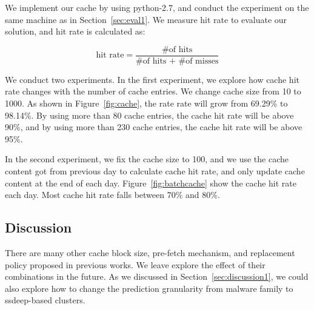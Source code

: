 We implement our cache by using python-2.7, 
and conduct the experiment on the same machine as in Section~\ref{sec:eval1}. 
We measure hit rate to evaluate our solution, and hit rate is calculated as: 

$$ \mbox{hit rate} = \dfrac{\mbox{\# of hits}}{\mbox{\# of hits + \# of misses}}$$

We conduct two experiments. In the first experiment, 
we explore how cache hit rate changes with the number of cache entries. 
We change cache size from 10 to 1000. As shown in Figure~\ref{fig:cache}, 
the rate rate will grow from 69.29\% to 98.14\%. 
By using more than 80 cache entries, the cache hit rate will be above 90\%, 
and by using more than 230 cache entries, the cache hit rate will be above 95\%. 

In the second experiment, we fix the cache size to 100, 
and we use the cache content got from previous day to calculate cache hit rate, 
and only update cache content at the end of each day. Figure~\ref{fig:batchcache} show the cache hit rate each day. 
Most cache hit rate falls between 70\% and 80\%.  

\subsection{Discussion}
There are many other cache block size, pre-fetch mechanism, and replacement policy proposed in previous works. 
We leave explore the effect of their combinations in the future. 
As we discussed in Section~\ref{sec:discussion1}, 
we could also explore how to change the prediction granularity from malware family to ssdeep-based clusters. 
